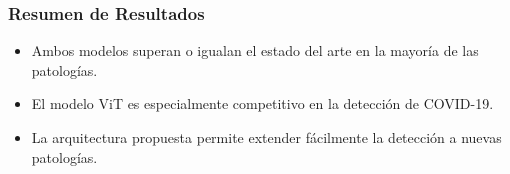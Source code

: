 \begin{frame}
\frametitle{Resumen de Resultados}
\begin{itemize}
    \item Ambos modelos superan o igualan el estado del arte en la mayoría de las patologías.
    \item El modelo ViT es especialmente competitivo en la detección de COVID-19.
    \item La arquitectura propuesta permite extender fácilmente la detección a nuevas patologías.
\end{itemize}
\end{frame}
